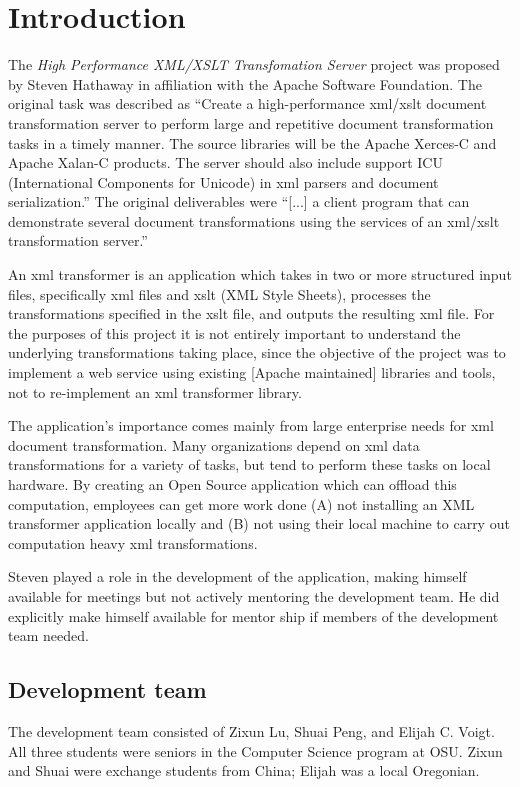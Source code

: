 \section{Introduction}



The \textit{High Performance XML/XSLT Transfomation Server} project was proposed by Steven Hathaway in affiliation with the Apache Software Foundation.
The original task was described as ``Create a high-performance \gls{xml}/\gls{xslt} document transformation server to perform large and repetitive document transformation tasks in a timely manner.
The source libraries will be the Apache Xerces-C and Apache Xalan-C products.
The server should also include support ICU (International Components for Unicode) in \gls{xml} parsers and document serialization.''
The original deliverables were ``[...] a client program that can demonstrate several document transformations using the services of an \gls{xml}/\gls{xslt} transformation server.'' 

An \gls{xml} transformer is an application which takes in two or more structured input files, specifically \gls{xml} files and \gls{xslt} (XML Style Sheets), processes the transformations specified in the \gls{xslt} file, and outputs the resulting \gls{xml} file.
For the purposes of this project it is not entirely important to understand the underlying transformations taking place, since the objective of the project was to implement a web service using existing [Apache maintained] libraries and tools, not to re-implement an \gls{xml} transformer library.

The application's importance comes mainly from large enterprise needs for \gls{xml} document transformation.
Many organizations depend on \gls{xml} data transformations for a variety of tasks, but tend to perform these tasks on local hardware.
By creating an Open Source application which can offload this computation, employees can get more work done (A) not installing an XML transformer application locally and (B) not using their local machine to carry out computation heavy \gls{xml} transformations.

Steven played a role in the development of the application, making himself available for meetings but not actively mentoring the development team. He did explicitly make himself available for mentor ship if members of the development team needed.

\subsection{Development team}

The development team consisted of Zixun Lu, Shuai Peng, and Elijah C. Voigt.
All three students were seniors in the Computer Science program at OSU.
Zixun and Shuai were exchange students from China; Elijah was a local Oregonian.
